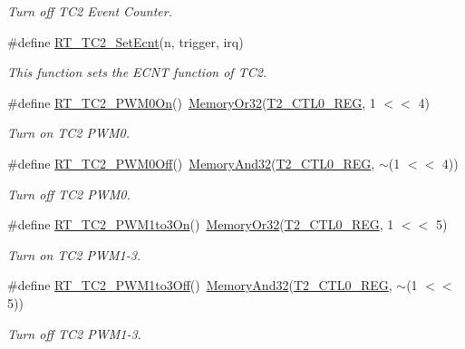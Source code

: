 \begin{DoxyCompactItemize}
\begin{DoxyCompactList}\small\item\em Turn off T\+C2 Event Counter. \end{DoxyCompactList}\item 
\#define \mbox{\hyperlink{a00083_af07bf5769df0423324194f22e008e832}{R\+T\+\_\+\+T\+C2\+\_\+\+Set\+Ecnt}}(n,  trigger,  irq)
\begin{DoxyCompactList}\small\item\em This function sets the E\+C\+NT function of T\+C2. \end{DoxyCompactList}\item 
\#define \mbox{\hyperlink{a00083_abaff3048e72dc0cb912c898a0a4c4e14}{R\+T\+\_\+\+T\+C2\+\_\+\+P\+W\+M0\+On}}()~\mbox{\hyperlink{a00026_a27874a97deab7cecdde5ddecf466e31e}{Memory\+Or32}}(\mbox{\hyperlink{a00026_a5853553391e986211306d4f29ab31e47}{T2\+\_\+\+C\+T\+L0\+\_\+\+R\+EG}}, 1 $<$$<$ 4)
\begin{DoxyCompactList}\small\item\em Turn on T\+C2 P\+W\+M0. \end{DoxyCompactList}\item 
\#define \mbox{\hyperlink{a00083_a52f984fc9f5bc4d1821025ad8d75f3c9}{R\+T\+\_\+\+T\+C2\+\_\+\+P\+W\+M0\+Off}}()~\mbox{\hyperlink{a00026_ad87cedffcaadc51db22594fce55173d4}{Memory\+And32}}(\mbox{\hyperlink{a00026_a5853553391e986211306d4f29ab31e47}{T2\+\_\+\+C\+T\+L0\+\_\+\+R\+EG}}, $\sim$(1 $<$$<$ 4))
\begin{DoxyCompactList}\small\item\em Turn off T\+C2 P\+W\+M0. \end{DoxyCompactList}\item 
\#define \mbox{\hyperlink{a00083_adc090dee2463a2a27b57234e63f0c0b5}{R\+T\+\_\+\+T\+C2\+\_\+\+P\+W\+M1to3\+On}}()~\mbox{\hyperlink{a00026_a27874a97deab7cecdde5ddecf466e31e}{Memory\+Or32}}(\mbox{\hyperlink{a00026_a5853553391e986211306d4f29ab31e47}{T2\+\_\+\+C\+T\+L0\+\_\+\+R\+EG}}, 1 $<$$<$ 5)
\begin{DoxyCompactList}\small\item\em Turn on T\+C2 P\+W\+M1-\/3. \end{DoxyCompactList}\item 
\#define \mbox{\hyperlink{a00083_adec1566e2c2a16ab922163a22f3c99df}{R\+T\+\_\+\+T\+C2\+\_\+\+P\+W\+M1to3\+Off}}()~\mbox{\hyperlink{a00026_ad87cedffcaadc51db22594fce55173d4}{Memory\+And32}}(\mbox{\hyperlink{a00026_a5853553391e986211306d4f29ab31e47}{T2\+\_\+\+C\+T\+L0\+\_\+\+R\+EG}}, $\sim$(1 $<$$<$ 5))
\begin{DoxyCompactList}\small\item\em Turn off T\+C2 P\+W\+M1-\/3. \end{DoxyCompactList}\item 

\end{DoxyCompactItemize}
